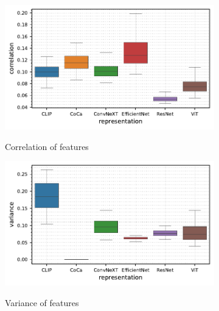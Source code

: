 \begin{figure}[t]
    \centering
    \begin{subfigure}[b]{0.495\textwidth}
        \centering
        \caption{\small Correlation of features}
        \includegraphics[width=\textwidth]{images/real-characteristics/image/properties-ImageNet-abscorr(representation,representation)-representation_CLIP,CoCa,ConvNeXT,EfficientNet,ResNet,ViT-class_0,999-data_ID-train.pdf}
        \label{fig:image-abscorr}
    \end{subfigure}
    \hfill
    \begin{subfigure}[b]{0.495\textwidth}
        \centering
        \caption{\small Variance of features}
        \includegraphics[width=\textwidth]{images/real-characteristics/image/properties-ImageNet-var(representation,representation)-representation_CLIP,CoCa,ConvNeXT,EfficientNet,ResNet,ViT-class_0,999-data_ID-train.pdf}
        \label{fig:image-var}
    \end{subfigure}
    \begin{subfigure}[b]{0.495\textwidth}

\end{subfigure}
\end{figure}
